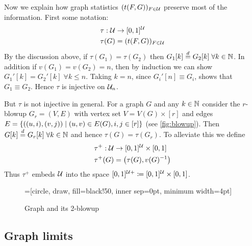 \documentclass{article}
\begin{document}
Now we explain how graph statistics $(t(F,G))_{F \in \Ug}$ preserve most of the information. First some notation:
\begin{align}
  \tau : \Ug &\to [0,1]^{\Ug} \nonumber\\
  \tau(G) &= (t(F, G))_{F \in \Ug}
  \label{eq:tau}
\end{align}
By the discussion above, if $\tau(G_1) = \tau(G_2)$  then $G_1[k] \dequal G_2[k] \; \forall k \in \N$.
In addition if $v(G_1) = v(G_2) = n$, then by induction we can show $G_1'[k] = G_2'[k] \; \forall k \leq n$. Taking $k=n$, since $G_i'[n] \equiv G_i$, shows that $G_1 \equiv G_2$. Hence $\tau$ is injective on $\Ug_{n}$. 

But $\tau$ is not injective in general. For a graph $G$ and any $k \in \N$ consider the $r$-blowup $G_r=(V,E)$ with vertex set $V = V(G) \times [r]$ and edges $E=\left\{ ((u, i), (v, j)) \mid (u,v) \in E(G), i,j \in [r] \right\}$ (see \autoref{fig:blowup}). Then  $G[k] \dequal G_r[k] \; \forall k \in \N$ and hence $\tau(G) = \tau(G_r)$. To alleviate this we define
\begin{align}
  \tau^+ : \Ug &\to [0,1]^{\Ug} \times [0, 1] \nonumber \\
  \tau^+(G) &= \left(\tau(G), v(G)^{-1}\right)
  \label{eq:embedding}
\end{align}
Thus $\tau^+$ embeds $\Ug$ into the space $[0,1]^{\Ug+} \coloneqq [0,1]^{\Ug}\times [0,1]$. 


\begin{figure}
  \centering
  =[circle, draw, fill=black!50,
                        inner sep=0pt, minimum width=4pt]
   \quad 
  \caption{Graph and its 2-blowup}
  \label{fig:blowup}
\end{figure}


\subsection{Graph limits}
\end{document}
